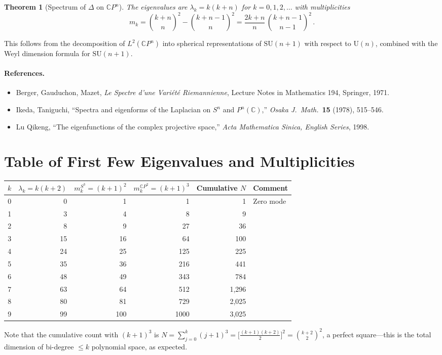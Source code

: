 \documentclass[11pt]{article}
\newtheorem{theorem}{Theorem}
\theoremstyle{remark}
\begin{document}
\begin{theorem}[Spectrum of $\Delta$ on $\mathbb{C}P^n$]
\label{thm:CPn-spectrum}
The eigenvalues are $\lambda_k = k(k+n)$ for $k = 0, 1, 2, \ldots$
with multiplicities
\begin{equation}
m_k = \binom{k+n}{n}^{\!2} - \binom{k+n-1}{n}^{\!2}
    = \frac{2k+n}{n}\,\binom{k+n-1}{n-1}^{\!2}\,.
\end{equation}
\end{theorem}

\noindent
This follows from the decomposition of $L^2(\mathbb{C}P^n)$ into spherical
representations of $\mathrm{SU}(n{+}1)$ with respect to $\mathrm{U}(n)$,
combined with the Weyl dimension formula for $\mathrm{SU}(n{+}1)$.

\paragraph{References.}
\begin{itemize}
\item Berger, Gauduchon, Mazet, \textit{Le Spectre d'une Vari\'et\'e
  Riemannienne}, Lecture Notes in Mathematics 194, Springer, 1971.
\item Ikeda, Taniguchi, ``Spectra and eigenforms of the Laplacian on
  $S^n$ and $P^n(\mathbb{C})$,'' \textit{Osaka J.\ Math.}\ \textbf{15}
  (1978), 515--546.
\item Lu Qikeng, ``The eigenfunctions of the complex projective space,''
  \textit{Acta Mathematica Sinica, English Series}, 1998.
\end{itemize}

\section{Table of First Few Eigenvalues and Multiplicities}

\begin{center}
\begin{tabular}{crrrrl}
\toprule
$k$ & $\lambda_k = k(k+2)$ & $m_k^{S^3} = (k+1)^2$ & $m_k^{\mathbb{C}P^2}
= (k+1)^3$ & Cumulative $N$ & Comment \\
\midrule
0 &   0 &   1 &    1 &      1 & Zero mode \\
1 &   3 &   4 &    8 &      9 & \\
2 &   8 &   9 &   27 &     36 & \\
3 &  15 &  16 &   64 &    100 & \\
4 &  24 &  25 &  125 &    225 & \\
5 &  35 &  36 &  216 &    441 & \\
6 &  48 &  49 &  343 &    784 & \\
7 &  63 &  64 &  512 &  1,296 & \\
8 &  80 &  81 &  729 &  2,025 & \\
9 &  99 & 100 & 1000 &  3,025 & \\
\bottomrule
\end{tabular}
\end{center}

Note that the cumulative count with $(k+1)^3$ is
$N = \sum_{j=0}^{k}(j+1)^3 = \bigl[\frac{(k+1)(k+2)}{2}\bigr]^2
= \binom{k+2}{2}^2$, a perfect square---this is the total dimension of
bi-degree $\leq k$ polynomial space, as expected.
\end{document}
